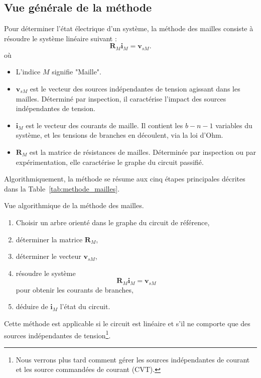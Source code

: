 \subsection{Vue générale de la méthode}
Pour déterminer l'état électrique d'un système, la méthode des mailles consiste à résoudre le système linéaire suivant : 
$$\mathbf{R}_M \mathbf{i}_M = \mathbf{v}_{sM}.$$
où 
\begin{itemize}
	\item L'indice $M$ signifie "Maille".
	\item $\mathbf{v}_{sM}$ est le vecteur des sources indépendantes de tension agissant dans les mailles. Déterminé par inspection, il caractérise l'impact des sources indépendantes de tension.
	\item $\mathbf{i}_M$ est le vecteur des courants de maille. Il contient les $b-n-1$ variables du système, et les tensions de branches en découlent, via la loi d'Ohm.
	\item $\mathbf{R}_M$ est la matrice de résistances de mailles. Déterminée par inspection ou par expérimentation, elle caractérise le graphe du circuit passifié.
\end{itemize}

Algorithmiquement, la méthode se résume aux cinq étapes principales décrites dans la Table~\ref{tab:methode_mailles}.
\begin{table}[tb]
	\caption{Vue algorithmique de la méthode des mailles. \label{tab:methode_mailles}}
	\begin{boxedminipage}{\textwidth}
		\begin{enumerate}
			\item Choisir un arbre orienté dans le graphe du circuit de référence,
			\item déterminer la matrice $\mathbf{R}_M$,
			\item déterminer le vecteur $\mathbf{v}_{sM}$,
			\item résoudre le système $$\mathbf{R}_M \mathbf{i}_M = \mathbf{v}_{sM}$$ pour obtenir les courants de branches,
			\item déduire de $\mathbf{i}_M$ l'état du circuit.
		\end{enumerate}
	\end{boxedminipage}
\end{table}
Cette méthode est applicable si le circuit est linéaire et s'il ne comporte que des sources indépendantes de tension\footnote{ Nous verrons plus tard comment gérer les sources indépendantes de courant et les source commandées de courant (CVT).}.

